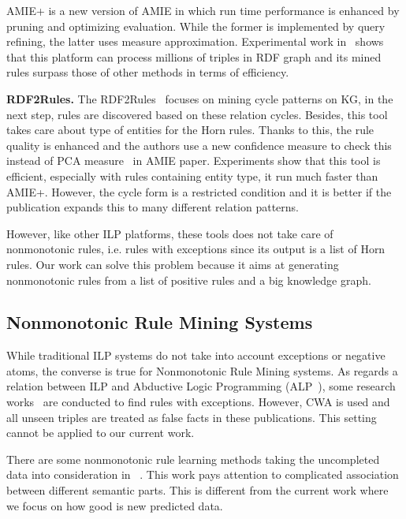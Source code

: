 AMIE+ is a new version of AMIE in which run time performance is enhanced by pruning and optimizing evaluation. While the former is implemented by query refining, the latter uses measure approximation. Experimental work in~\cite{ref10} shows that this platform can process millions of triples in RDF graph and its mined rules surpass those of other methods in terms of efficiency.

\textbf{RDF2Rules.} The RDF2Rules~\cite{ref29} focuses on mining cycle patterns on KG, in the next step, rules are discovered based on these relation cycles. Besides, this tool takes care about type of entities for the Horn rules. Thanks to this, the rule quality is enhanced and the authors use a new confidence measure to check this instead of PCA measure~\cite{ref10} in AMIE paper. Experiments show that this tool is efficient, especially with rules containing entity type, it run much faster than AMIE+. However, the cycle form is a restricted condition and it is better if the publication expands this to many different relation patterns.

However, like other ILP platforms, these tools does not take care of nonmonotonic rules, i.e. rules with exceptions since its output is a list of Horn rules. Our work can solve this problem because it aims at generating nonmonotonic rules from a list of positive rules and a big knowledge graph.

\subsection{Nonmonotonic Rule Mining Systems}
\label{related-work-nonmonotonic-rule-mining-systems}

While traditional ILP systems do not take into account exceptions or negative atoms, the converse is true for Nonmonotonic Rule Mining systems. As regards a relation between ILP and Abductive Logic Programming (ALP~\cite{ref31}), some research works~\cite{ref11, ref32, ref33} are conducted to find rules with exceptions. However, CWA is used and all unseen triples are treated as false facts in these publications. This setting cannot be applied to our current work.

There are some nonmonotonic rule learning methods taking the uncompleted data into consideration in ~\cite{ref34}. This work pays attention to complicated association between different semantic parts. This is different from the current work where we focus on how good is new predicted data.

